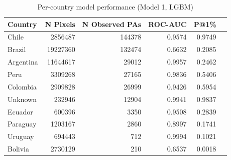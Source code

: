 \begin{table}[h]
\centering
\begin{tabular}{lrrrrr}
\toprule
Country & N Pixels & N Observed PAs & ROC-AUC & P@1\% \\
\midrule
Chile & 2856487 & 144378 & 0.9574 & 0.9749 \\
Brazil & 19227360 & 132474 & 0.6632 & 0.2085 \\
Argentina & 11644617 & 29012 & 0.9957 & 0.2462 \\
Peru & 3309268 & 27165 & 0.9836 & 0.5406 \\
Colombia & 2909828 & 26999 & 0.9426 & 0.5954 \\
Unknown & 232946 & 12904 & 0.9941 & 0.9837 \\
Ecuador & 600396 & 3350 & 0.9508 & 0.2839 \\
Paraguay & 1203167 & 2860 & 0.8997 & 0.1741 \\
Uruguay & 694443 & 712 & 0.9994 & 0.1021 \\
Bolivia & 2730129 & 210 & 0.6537 & 0.0018 \\
\bottomrule
\end{tabular}
\caption{Per-country model performance (Model 1, LGBM)}
\label{tab:country_breakdown_lgbm}
\end{table}
